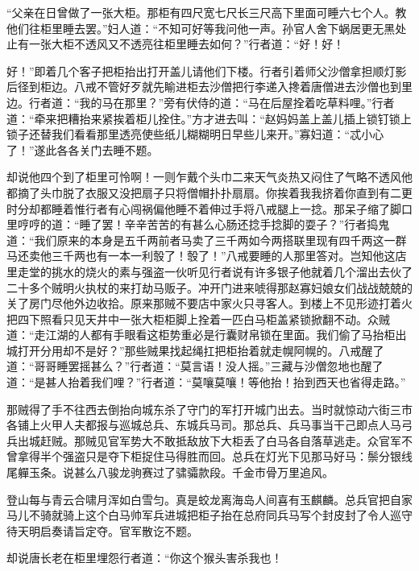 \documentclass[12pt,UTF8]{ctexbook}
\begin{document}
{	“父亲在日曾做了一张大柜。那柜有四尺宽七尺长三尺高下里面可睡六七个人。教他们往柜里睡去罢。”妇人道：“不知可好等我问他一声。孙官人舍下蜗居更无黑处止有一张大柜不透风又不透亮往柜里睡去如何？”行者道：“好！好！
	
	好！”即着几个客子把柜抬出打开盖儿请他们下楼。行者引着师父沙僧拿担顺灯影后径到柜边。八戒不管好歹就先睮进柜去沙僧把行李递入搀着唐僧进去沙僧也到里边。行者道：“我的马在那里？”旁有伏侍的道：“马在后屋拴着吃草料哩。”行者道：“牵来把糟抬来紧挨着柜儿拴住。”方才进去叫：“赵妈妈盖上盖儿插上锁钉锁上锁子还替我们看看那里透亮使些纸儿糊糊明日早些儿来开。”寡妇道：“忒小心了！”遂此各各关门去睡不题。
	
	却说他四个到了柜里可怜啊！一则乍戴个头巾二来天气炎热又闷住了气略不透风他都摘了头巾脱了衣服又没把扇子只将僧帽扑扑扇扇。你挨着我我挤着你直到有二更时分却都睡着惟行者有心闯祸偏他睡不着伸过手将八戒腿上一捻。那呆子缩了脚口里哼哼的道：“睡了罢！辛辛苦苦的有甚么心肠还捻手捻脚的耍子？”行者捣鬼道：“我们原来的本身是五千两前者马卖了三千两如今两搭联里现有四千两这一群马还卖他三千两也有一本一利彀了！彀了！”八戒要睡的人那里答对。岂知他这店里走堂的挑水的烧火的素与强盗一伙听见行者说有许多银子他就着几个溜出去伙了二十多个贼明火执杖的来打劫马贩子。冲开门进来唬得那赵寡妇娘女们战战兢兢的关了房门尽他外边收拾。原来那贼不要店中家火只寻客人。到楼上不见形迹打着火把四下照看只见天井中一张大柜柜脚上拴着一匹白马柜盖紧锁掀翻不动。众贼道：“走江湖的人都有手眼看这柜势重必是行囊财帛锁在里面。我们偷了马抬柜出城打开分用却不是好？”那些贼果找起绳扛把柜抬着就走幌阿幌的。八戒醒了道：“哥哥睡罢摇甚么？”行者道：“莫言语！没人摇。”三藏与沙僧忽地也醒了道：“是甚人抬着我们哩？”行者道：“莫嚷莫嚷！等他抬！抬到西天也省得走路。”
	
	那贼得了手不往西去倒抬向城东杀了守门的军打开城门出去。当时就惊动六街三市各铺上火甲人夫都报与巡城总兵、东城兵马司。那总兵、兵马事当干己即点人马弓兵出城赶贼。那贼见官军势大不敢抵敌放下大柜丢了白马各自落草逃走。众官军不曾拿得半个强盗只是夺下柜捉住马得胜而回。总兵在灯光下见那马好马：鬃分银线尾軃玉条。说甚么八骏龙驹赛过了骕骦款段。千金市骨万里追风。
	
	登山每与青云合啸月浑如白雪匀。真是蛟龙离海岛人间喜有玉麒麟。总兵官把自家马儿不骑就骑上这个白马帅军兵进城把柜子抬在总府同兵马写个封皮封了令人巡守待天明启奏请旨定夺。官军散讫不题。
	
	却说唐长老在柜里埋怨行者道：“你这个猴头害杀我也！
	
}
\end{document}
